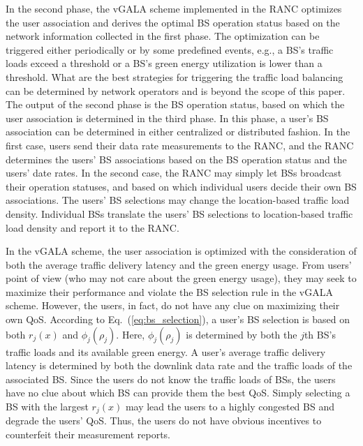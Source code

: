 \documentclass[journal]{IEEEtran}
\theoremstyle{definition}
\begin{document}
In the second phase, the vGALA scheme implemented in the RANC optimizes the user association and derives the optimal BS operation status based on the network information collected in the first phase. The optimization can be triggered either periodically or by some predefined events, e.g., a BS's traffic loads exceed a threshold or a BS's green energy utilization is lower than a threshold. What are the best strategies for triggering the traffic load balancing can be determined by network operators and is beyond the scope of this paper. The output of the second phase is the BS operation status, based on which the user association is determined in the third phase. In this phase, a user's BS association can be determined in either centralized or distributed fashion. In the first case, users send their data rate measurements to the RANC, and the RANC determines the users' BS associations based on the BS operation status and the users' date rates. In the second case, the RANC may simply let BSs broadcast their operation statuses, and based on which individual users decide their own BS associations. The users' BS selections may change the location-based traffic load density. Individual BSs translate the users' BS selections to location-based traffic load density and report it to the RANC.

In the vGALA scheme, the user association is optimized with the consideration of both the average traffic delivery latency and the green energy usage. From users' point of view (who may not care about the green energy usage), they may seek to maximize their performance and violate the BS selection rule in the vGALA scheme. However, the users, in fact, do not have any clue on maximizing their own QoS. According to Eq.~(\ref{eq:bs_selection}), a user's BS selection is based on both $r_{j}(x)$ and $\phi_{j}(\rho_{j})$. Here, $\phi_{j}(\rho_{j})$ is determined by both the $j$th BS's traffic loads and its available green energy. A user's average traffic delivery latency is determined by both the downlink data rate and the traffic loads of the associated BS. Since the users do not know the traffic loads of BSs, the users have no clue about which BS can provide them the best QoS. Simply selecting a BS with the largest $r_{j}(x)$ may lead the users to a highly congested BS and degrade the users' QoS. Thus, the users do not have obvious incentives to counterfeit their measurement reports.
\end{document}
